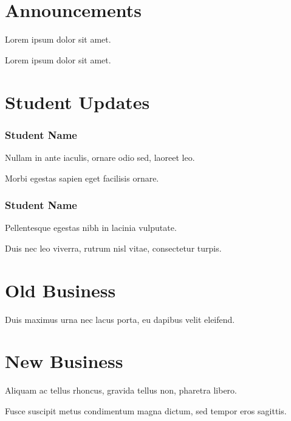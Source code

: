 \documentclass[11pt]{meetingmins}
\begin{document}
\maketitle

\section{Announcements}
\begin{hiddenitems}
\item Lorem ipsum dolor sit amet.
\item Lorem ipsum dolor sit amet.
\end{hiddenitems}

\section{Student Updates}

	\subsubsection{Student Name}
	\begin{hiddensubitems}
	\item Nullam in ante iaculis, ornare odio sed, laoreet leo.
	\item Morbi egestas sapien eget facilisis ornare.
	\end{hiddensubitems}

	\subsubsection{Student Name}
	\begin{hiddensubitems}
	\item Pellentesque egestas nibh in lacinia vulputate.
	\item Duis nec leo viverra, rutrum nisl vitae, consectetur turpis.
	\end{hiddensubitems}

\section{Old Business}
\begin{items}
\item Duis maximus urna nec lacus porta, eu dapibus velit eleifend.
\priormins
\end{items}

\section{New Business}
\begin{items}
\item Aliquam ac tellus rhoncus, gravida tellus non, pharetra libero.
\item Fusce suscipit metus condimentum magna dictum, sed tempor eros sagittis.
\end{items}

\vspace{1em}
\end{document}
